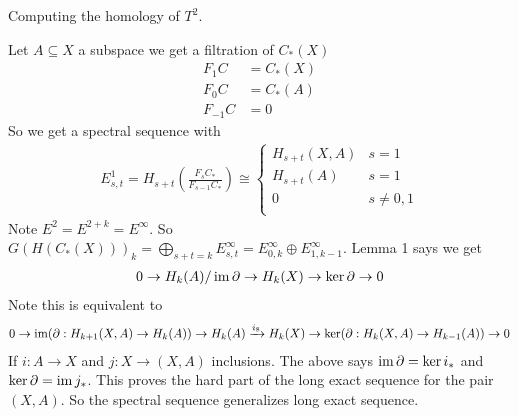 \documentclass[12pt,class=article,crop=false]{standalone}
\begin{document}
\begin{eg}
Computing the homology of $ T^2$.
\end{eg}
\begin{eg}
Let $ A \subseteq X$ a subspace we get a filtration of $ C_*(X)$
 \begin{align*}
	 F_1C &= C_*(X)\\
	F_0C &= C_*(A)\\
	F_{-1}C &= 0 
\end{align*}
So we get a spectral sequence with
\begin{align*}
	E_{s,t}^{1} = H_{s+t}\left( \frac{F_s C_*}{ F_{s-1}C_*} \right)  \cong \begin{cases}
		H_{s+t}(X,A) & s=1\\
		H_{s+t} (A) & s=1\\
		0 & s \neq 0,1\\
	\end{cases}
\end{align*}
Note $ E^2 = E^{2+k}  = E^{\infty}$. So $ G(H(C_*(X)))_k = \bigoplus_{ s+t=k} E_{s,t}^{\infty} = E_{0,k}^{\infty} \oplus E_{1,k-1}^{\infty}$. Lemma 1 says we get
\begin{align*}
	0 \to H_k(A) / \operatorname{im} \partial \to H_k(X) \to \ker \partial \to 0
\end{align*}
Note this is equivalent to
\begin{align*}
	0 \to \operatorname{im} (\partial : H_{k+1}(X,A) \to H_k(A)) \to H_k(A) \xrightarrow{ i_8}  H_k(X) \to \ker (\partial :H_{k}(X,A) \to H_{k-1}(A)) \to 0
\end{align*}
If $ i: A \to X$ and $ j: X \to (X,A)$ inclusions. The above says $ \operatorname{im} \partial = \ker i_*$ and $ \ker \partial  = \operatorname{im} j_*$. This proves the hard part of the long exact sequence for the pair $ (X,A)$. So the spectral sequence generalizes long exact sequence.
\end{eg}
\end{document}
